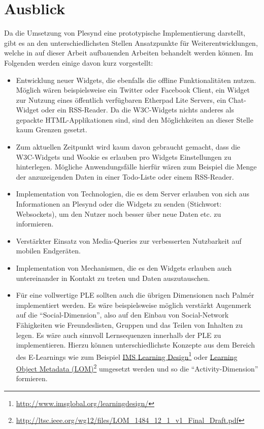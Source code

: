 \section{Ausblick}
Da die Umsetzung von Plesynd eine prototypische Implementierung darstellt, gibt es an den unterschiedlichsten Stellen Ansatzpunkte für Weiterentwicklungen, welche in auf dieser Arbeit aufbauenden Arbeiten behandelt werden können. Im Folgenden werden einige davon kurz vorgestellt:

\begin{itemize}
 \item Entwicklung neuer Widgets, die ebenfalls die offline Funktionalitäten nutzen. Möglich wären beispielsweise ein Twitter oder Facebook Client, ein Widget zur Nutzung eines öffentlich verfügbaren Etherpad Lite Servers, ein Chat-Widget oder ein RSS-Reader. Da die W3C-Widgets nichts anderes als gepackte HTML-Applikationen sind, sind den Möglichkeiten an dieser Stelle kaum Grenzen gesetzt.
 \item Zum aktuellen Zeitpunkt wird kaum davon gebraucht gemacht, dass die W3C-Widgets und Wookie es erlauben pro Widgets Einstellungen zu hinterlegen. Mögliche Anwendungsfälle hierfür wären zum Beispiel die Menge der anzuzeigenden Daten in einer Todo-Liste oder einem RSS-Reader.
 \item Implementation von Technologien, die es dem Server erlauben von sich aus Informationen an Plesynd oder die Widgets zu senden (Stichwort: Websockets), um den Nutzer noch besser über neue Daten etc. zu informieren.
 \item Verstärkter Einsatz von Media-Queries zur verbesserten Nutzbarkeit auf mobilen Endgeräten.
 \item Implementation von Mechanismen, die es den Widgets erlauben auch untereinander in Kontakt zu treten und Daten auszutauschen.
 \item Für eine vollwertige PLE sollten auch die übrigen Dimensionen nach Palmér implementiert werden. Es wäre beispielsweise möglich verstärkt Augenmerk auf die "`Social-Dimension"', also auf den Einbau von Social-Network Fähigkeiten wie Freundeslisten, Gruppen und das Teilen von Inhalten zu legen. Es wäre auch sinnvoll Lernsequenzen innerhalb der PLE zu implementieren. Hierzu können unterschiedlichste Konzepte aus dem Bereich des E-Learnings wie zum Beispiel \href{http://www.imsglobal.org/learningdesign/}{IMS Learning Design}\footnote{\url{http://www.imsglobal.org/learningdesign/}} oder \href{http://ltsc.ieee.org/wg12/files/LOM_1484_12_1_v1_Final_Draft.pdf}{Learning Object Metadata (LOM)}\footnote{\url{http://ltsc.ieee.org/wg12/files/LOM_1484_12_1_v1_Final_Draft.pdf}} umgesetzt werden und so die "`Activity-Dimension"' formieren.

\end{itemize}

